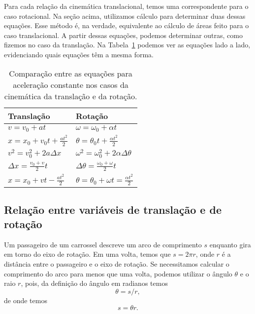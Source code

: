  Para cada relação da cinemática translacional, temos uma correspondente para o caso rotacional. Na seção acima, utilizamos cálculo para determinar duas dessas equações. Esse método é, na verdade, equivalente ao cálculo de áreas feito para o caso translacional. A partir dessas equações, podemos determinar outras, como fizemos no caso da translação. Na Tabela~\ref{Tab:CompEqsTransRot} podemos ver as equações lado a lado, evidenciando quais equações têm a mesma forma.

\begin{table}[!h]
\centering
\caption{Comparação entre as equações para aceleração constante nos casos da cinemática da translação e da rotação.\label{Tab:CompEqsTransRot}}
\begin{tabular}{ll}
\toprule
Translação & Rotação \\
\midrule
$v = v_0 + at$ & $\omega = \omega_0 + \alpha t$ \\
$x = x_0 + v_0 t +\frac{at^2}{2}$ & $\theta = \theta_0 t + \frac{\alpha t^2}{2}$ \\
$v^2 = v_0^2 + 2 a \Delta x$ & $\omega^2 = \omega_0^2 + 2\alpha \Delta\theta$ \\
$\Delta x = \frac{v_0 + v}{2} t$ & $\Delta\theta = \frac{\omega_0 + \omega}{2} t$ \\
$x = x_0 + vt - \frac{at^2}{2}$ & $\theta = \theta_0 + \omega t = \frac{\alpha t^2}{2}$ \\
\bottomrule
\end{tabular}
\end{table}

\subsection{Relação entre variáveis de translação e de rotação}

Um passageiro de um carrossel descreve um arco de comprimento $s$ enquanto gira em torno do eixo de rotação. Em uma volta, temos que $s = 2\pi r$, onde $r$ é a distância entre o passageiro e o eixo de rotação. Se necessitamos calcular o comprimento do arco para menos que uma volta, podemos utilizar o ângulo $\theta$ e o raio $r$, pois, da definição do ângulo em radianos temos
\begin{equation}
	\theta = s/r,
\end{equation}
%
de onde temos
\begin{equation}
	s = \theta r.
\end{equation}

